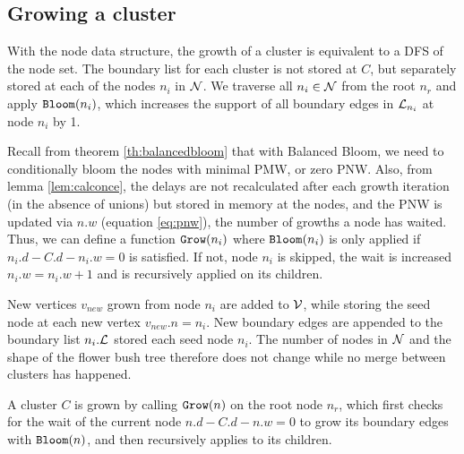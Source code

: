 \subsection{Growing a cluster}\label{sec:growingcluster}

With the node data structure, the growth of a cluster is equivalent to a DFS of the node set. The boundary list for each cluster is not stored at $C$, but separately stored at each of the nodes $n_i$ in $\mathcal{N}$. We traverse all $n_i \in \mathcal{N}$ from the root $n_r$ and apply $\texttt{Bloom}(n_i)$, which increases the support of all boundary edges in $\mathcal{L}_{n_i}$ at node $n_i$ by 1.

Recall from theorem \ref{th:balancedbloom} that with Balanced Bloom, we need to conditionally bloom the nodes with minimal PMW, or zero PNW. Also, from lemma \ref{lem:calconce}, the delays are not recalculated after each growth iteration (in the absence of unions) but stored in memory at the nodes, and the PNW is updated via $n.w$ (equation \ref{eq:pnw}), the number of growths a node has waited. Thus, we can define a function $\texttt{Grow}(n_i)$ where $\texttt{Bloom}(n_i)$ is only applied if $n_i.d - C.d - n_i.w = 0$ is satisfied. If not, node $n_i$ is skipped, the wait is increased $n_i.w = n_i.w +1$ and  is recursively applied on its children.

New vertices $v_{new}$ grown from node $n_i$ are added to $\mathcal{V}$, while storing the seed node at each new vertex $v_{new}.n = n_i$. New boundary edges are appended to the boundary list $n_i.\mathcal{L}$ stored each seed node $n_i$. The number of nodes in $\mathcal{N}$ and the shape of the flower bush tree therefore does not change while no merge between clusters has happened.

\begin{theorem}\label{the:grownode}
  A cluster $C$ is grown by calling $\texttt{Grow}(n)$ on the root node $n_r$, which first checks for the wait of the current node $ n.d - C.d - n.w = 0$ to grow its boundary edges with $\texttt{Bloom}(n)$, and then recursively applies  to its children.
\end{theorem}

\begin{algo}[algotitle=Grow, label=al:bbgrow]
\begin{algorithm}[H]


\KwData{\node}

\BlankLine


\end{algorithm}
\end{algo}


